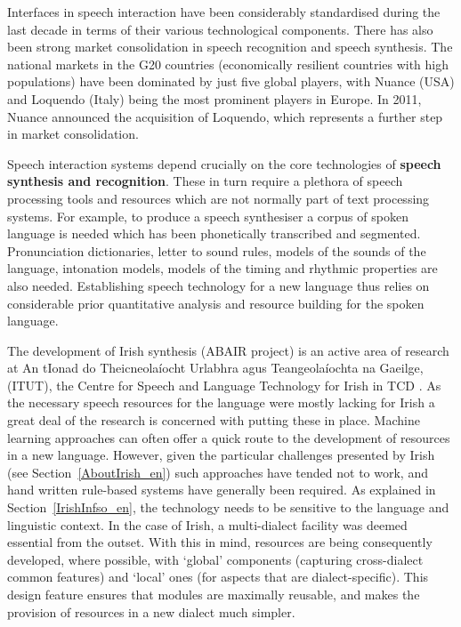 \begin{multicols}{2}
Interfaces in speech interaction have been considerably standardised during the last decade in terms of their various technological components. There has also been strong market consolidation in speech recognition and speech synthesis. The national markets in the G20 countries (economically resilient countries with high populations) have been dominated by just five global players, with Nuance (USA) and Loquendo (Italy) being the most prominent players in Europe. In 2011, Nuance announced the acquisition of Loquendo, which represents a further step in market consolidation.


Speech interaction systems depend crucially on the core technologies of \textbf{speech synthesis and recognition}. These in turn require a plethora of speech processing tools and resources which are not normally part of text processing systems. For example, to produce a speech synthesiser a corpus of spoken language is needed which has been phonetically transcribed and segmented. Pronunciation dictionaries, letter to sound rules, models of the sounds of the language, intonation models, models of the timing and rhythmic properties are also needed. Establishing speech technology for a new language thus relies on considerable prior quantitative analysis and resource building for the spoken language. 

The development of Irish synthesis (ABAIR project) is an active area of research at An tIonad do Theicneolaíocht Urlabhra agus Teangeolaíochta na Gaeilge, (ITUT), the Centre for Speech and Language Technology for Irish in TCD \cite{pittsburgh}.  As the necessary speech resources for the language were mostly lacking for Irish a great deal of the research is concerned with putting these in place. Machine learning approaches can often offer a quick route to the development of resources in a new language. However, given the particular challenges presented by Irish (see Section~\ref{AboutIrish_en}) such approaches have tended not to work, and hand written rule-based systems have generally been required. As explained in Section~\ref{IrishInfso_en}, the technology needs to be sensitive to the language and linguistic context. In the case of Irish, a multi-dialect facility was deemed essential from the outset. With this in mind, resources are being consequently developed, where possible, with `global’ components (capturing cross-dialect common features) and `local' ones (for aspects that are dialect-specific). This design feature ensures that modules are maximally reusable, and makes the provision of resources in a new dialect much simpler.


\end{multicols}
